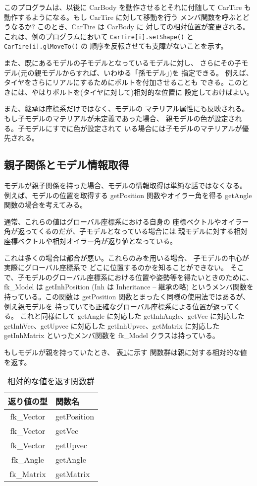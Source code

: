 このプログラムは、以後に CarBody を動作させるとそれに付随して
CarTire も動作するようになる。もし CarTire に対して移動を行う
メンバ関数を呼ぶとどうなるか? このとき、CarTire は CarBody に
対しての相対位置が変更される。これは、例のプログラムにおいて
{\tt CarTire[i].setShape()} と {\tt CarTire[i].glMoveTo()} の
順序を反転させても支障がないことを示す。

また、既にあるモデルの子モデルとなっているモデルに対し、
さらにその子モデル(元の親モデルからすれば、いわゆる「孫モデル」)を
指定できる。
例えば、タイヤをさらにリアルにするためにボルトを付加させることも
できる。このときには、やはりボルトを(タイヤに対して)相対的な位置に
設定しておけばよい。

また、継承は座標系だけではなく、モデルの
マテリアル属性にも反映される。もし子モデルのマテリアルが未定義であった場合、
親モデルの色が設定される。子モデルにすでに色が設定されて
いる場合には子モデルのマテリアルが優先される。

\subsection{親子関係とモデル情報取得}
モデルが親子関係を持った場合、モデルの情報取得は単純な話ではなくなる。
例えば、モデルの位置を取得する getPosition 関数やオイラー角を得る
getAngle 関数の場合を考えてみる。

通常、これらの値はグローバル座標系における自身の
座標ベクトルやオイラー角が返ってくるのだが、子モデルとなっている場合には
親モデルに対する相対座標ベクトルや相対オイラー角が返り値となっている。

これは多くの場合は都合が悪い。これらのみを用いる場合、
子モデルの中心が実際にグローバル座標系で
どこに位置するのかを知ることができない。
そこで、子モデルのグローバル座標系における位置や姿勢等を得たいときのために、
fk\_Model は getInhPosition (Inh は Inheritance -- 継承の略)
というメンバ関数を持っている。この関数は
getPosition 関数とまったく同様の使用法ではあるが、例え親モデルを
持っていても正確なグローバル座標系による位置が返ってくる。
これと同様にして getAngle に対応した
getInhAngle、getVec に対応した getInhVec、getUpvec に対応した
getInhUpvec、getMatrix に対応した getInhMatrix といったメンバ関数を
fk\_Model クラスは持っている。

もしモデルが親を持っていたとき、
表\ref{tbl:fkInh1}に示す
関数群は親に対する相対的な値を返す。

\begin{table}[H]
\caption{相対的な値を返す関数群}
\label{tbl:fkInh1}
\begin{center}
\begin{tabular}{|c|l|}
\hline
返り値の型 & 関数名 \\ \hline \hline
fk\_Vector & getPosition \\ \hline
fk\_Vector & getVec \\ \hline
fk\_Vector & getUpvec \\ \hline
fk\_Angle & getAngle \\ \hline
fk\_Matrix & getMatrix \\ \hline
\end{tabular}
\end{center}
\end{table}


